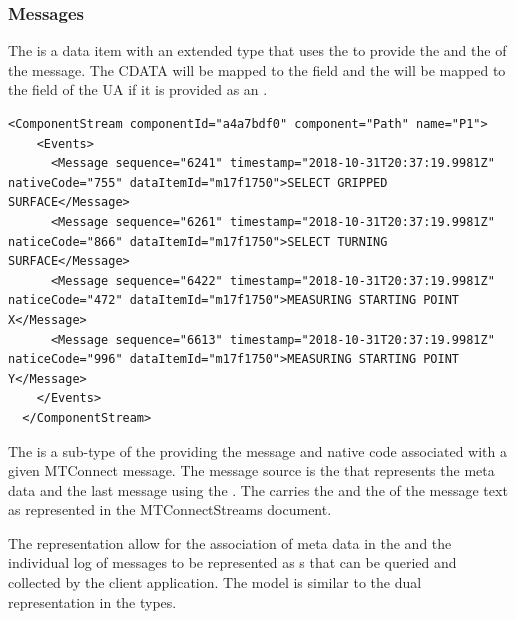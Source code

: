\FloatBarrier





\subsubsection{Messages}

The  is a data item with an extended type that uses the  to provide the  and the  of the message. The \gls{CDATA} will be mapped to the  field and the  will be mapped to the field of the UA  if it is provided as an .

\begin{lstlisting}[firstnumber=last,escapechar=|,%
    caption={Path Motion Program Normal},label={lst:path-motion-program-condition-3}]
  <ComponentStream componentId="a4a7bdf0" component="Path" name="P1">
    <Events>
      <Message sequence="6241" timestamp="2018-10-31T20:37:19.9981Z" nativeCode="755" dataItemId="m17f1750">SELECT GRIPPED SURFACE</Message>
      <Message sequence="6261" timestamp="2018-10-31T20:37:19.9981Z" naticeCode="866" dataItemId="m17f1750">SELECT TURNING SURFACE</Message>
      <Message sequence="6422" timestamp="2018-10-31T20:37:19.9981Z" naticeCode="472" dataItemId="m17f1750">MEASURING STARTING POINT X</Message>
      <Message sequence="6613" timestamp="2018-10-31T20:37:19.9981Z" naticeCode="996" dataItemId="m17f1750">MEASURING STARTING POINT Y</Message>
    </Events>
  </ComponentStream>
\end{lstlisting}

The  is a sub-type of the  providing the message and native code associated with a given MTConnect message. The message source is the   that represents the meta data and the last message using the . The  carries the  and the  of the message text as represented in the MTConnectStreams document.

The representation allow for the association of meta data in the  and the individual log of messages to be represented as s that can be queried and collected by the client application. The model is similar to the dual representation in the  types.

